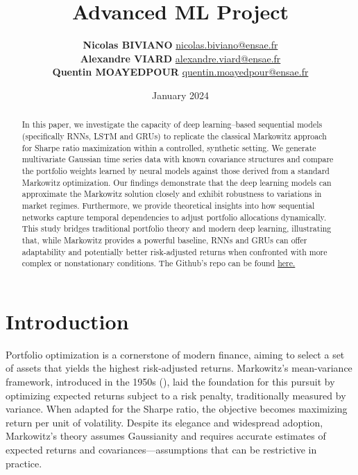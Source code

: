 \documentclass[11pt]{article}
\title{Advanced ML Project}
\author{
    \textbf{Nicolas BIVIANO} \href{mailto:nicolas.biviano@ensae.fr}{nicolas.biviano@ensae.fr} \\
    \textbf{Alexandre VIARD} \href{mailto:alexandre.viard@ensae.fr}{alexandre.viard@ensae.fr} \\
    \textbf{Quentin MOAYEDPOUR} \href{mailto:quentin.moayedpour@ensae.fr}{quentin.moayedpour@ensae.fr}
}
\date{January 2024}
\begin{document}
\maketitle

\begin{abstract}
    


In this paper, we investigate the capacity of deep learning–based sequential models (specifically RNNs, LSTM and GRUs) to replicate the classical Markowitz approach for Sharpe ratio maximization within a controlled, synthetic setting. We generate multivariate Gaussian time series data with known covariance structures and compare the portfolio weights learned by neural models against those derived from a standard Markowitz optimization. Our findings demonstrate that the deep learning models can approximate the Markowitz solution closely and exhibit robustness to variations in market regimes. Furthermore, we provide theoretical insights into how sequential networks capture temporal dependencies to adjust portfolio allocations dynamically. This study bridges traditional portfolio theory and modern deep learning, illustrating that, while Markowitz provides a powerful baseline, RNNs and GRUs can offer adaptability and potentially better risk-adjusted returns when confronted with more complex or nonstationary conditions. The Github's repo can be found \href{https://github.com/QMoayedpour/Advanced_ML_Ensae/tree/main}{here.}
\end{abstract}

\section{Introduction}

Portfolio optimization is a cornerstone of modern finance, aiming to select a set of assets that yields the highest risk-adjusted returns. Markowitz’s mean-variance framework, introduced in the 1950s (\cite{e5a1bb8f-41b7-35c6-95cd-8b366d3e99bc}), laid the foundation for this pursuit by optimizing expected returns subject to a risk penalty, traditionally measured by variance. When adapted for the Sharpe ratio, the objective becomes maximizing return per unit of volatility. Despite its elegance and widespread adoption, Markowitz’s theory assumes Gaussianity and requires accurate estimates of expected returns and covariances—assumptions that can be restrictive in practice.
\end{document}
